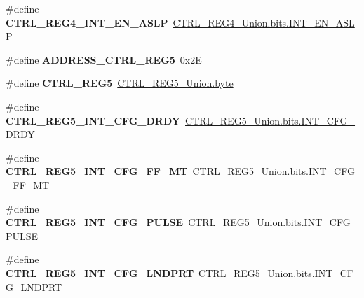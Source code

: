 \begin{DoxyCompactItemize}
\item 
\hypertarget{group__accel__module_gaf585eae83a172887d6e4a09776201ece}{}\#define {\bfseries C\+T\+R\+L\+\_\+\+R\+E\+G4\+\_\+\+I\+N\+T\+\_\+\+E\+N\+\_\+\+A\+S\+L\+P}~\hyperlink{accel_8c_adbe32d0cc8c6d5c9ec9c09cee1a9794b}{C\+T\+R\+L\+\_\+\+R\+E\+G4\+\_\+\+Union.\+bits.\+I\+N\+T\+\_\+\+E\+N\+\_\+\+A\+S\+L\+P}\label{group__accel__module_gaf585eae83a172887d6e4a09776201ece}

\item 
\hypertarget{group__accel__module_ga49ce134ea00f6ed183170893a6c3eb5c}{}\#define {\bfseries A\+D\+D\+R\+E\+S\+S\+\_\+\+C\+T\+R\+L\+\_\+\+R\+E\+G5}~0x2\+E\label{group__accel__module_ga49ce134ea00f6ed183170893a6c3eb5c}

\item 
\hypertarget{group__accel__module_ga97cbbf0a1e80e40544629e925e5a9026}{}\#define {\bfseries C\+T\+R\+L\+\_\+\+R\+E\+G5}~\hyperlink{accel_8c_a96f44d20f1dbf1c8785a7bc99a46164c}{C\+T\+R\+L\+\_\+\+R\+E\+G5\+\_\+\+Union.\+byte}\label{group__accel__module_ga97cbbf0a1e80e40544629e925e5a9026}

\item 
\hypertarget{group__accel__module_gad05d274f8ecae9855e046ba41ef1ed92}{}\#define {\bfseries C\+T\+R\+L\+\_\+\+R\+E\+G5\+\_\+\+I\+N\+T\+\_\+\+C\+F\+G\+\_\+\+D\+R\+D\+Y}~\hyperlink{accel_8c_af62ca343abd81859a54fc347f38c0f76}{C\+T\+R\+L\+\_\+\+R\+E\+G5\+\_\+\+Union.\+bits.\+I\+N\+T\+\_\+\+C\+F\+G\+\_\+\+D\+R\+D\+Y}\label{group__accel__module_gad05d274f8ecae9855e046ba41ef1ed92}

\item 
\hypertarget{group__accel__module_gaa52dbce803d113ac4b2bbbf24856746a}{}\#define {\bfseries C\+T\+R\+L\+\_\+\+R\+E\+G5\+\_\+\+I\+N\+T\+\_\+\+C\+F\+G\+\_\+\+F\+F\+\_\+\+M\+T}~\hyperlink{accel_8c_ab781df7ed3c96435ed9528b178fc433f}{C\+T\+R\+L\+\_\+\+R\+E\+G5\+\_\+\+Union.\+bits.\+I\+N\+T\+\_\+\+C\+F\+G\+\_\+\+F\+F\+\_\+\+M\+T}\label{group__accel__module_gaa52dbce803d113ac4b2bbbf24856746a}

\item 
\hypertarget{group__accel__module_ga789767ffe8f1255faef94813f58e95c0}{}\#define {\bfseries C\+T\+R\+L\+\_\+\+R\+E\+G5\+\_\+\+I\+N\+T\+\_\+\+C\+F\+G\+\_\+\+P\+U\+L\+S\+E}~\hyperlink{accel_8c_a6090cd9b7d757fce5aedb4bd80679442}{C\+T\+R\+L\+\_\+\+R\+E\+G5\+\_\+\+Union.\+bits.\+I\+N\+T\+\_\+\+C\+F\+G\+\_\+\+P\+U\+L\+S\+E}\label{group__accel__module_ga789767ffe8f1255faef94813f58e95c0}

\item 
\hypertarget{group__accel__module_ga831ca72150d851701a255830448716aa}{}\#define {\bfseries C\+T\+R\+L\+\_\+\+R\+E\+G5\+\_\+\+I\+N\+T\+\_\+\+C\+F\+G\+\_\+\+L\+N\+D\+P\+R\+T}~\hyperlink{accel_8c_a8f31e3b92ce5d814a88ed9984d94ffc9}{C\+T\+R\+L\+\_\+\+R\+E\+G5\+\_\+\+Union.\+bits.\+I\+N\+T\+\_\+\+C\+F\+G\+\_\+\+L\+N\+D\+P\+R\+T}\label{group__accel__module_ga831ca72150d851701a255830448716aa}


\end{DoxyCompactItemize}
